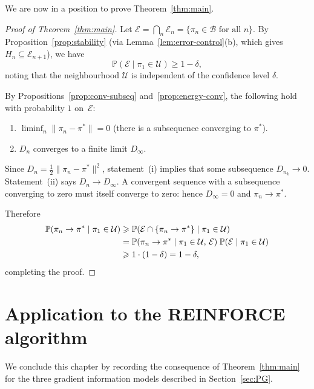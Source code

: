 \documentclass[a4paper,oneside,11pt]{report}
\newcommand{\Prob}{\mathbb{P}}
\newcommand{\calB}{\mathcal{B}}
\newcommand{\calE}{\mathcal{E}}
\newcommand{\calU}{\mathcal{U}}
\newcommand{\norm}[1]{\| #1 \|}
\numberwithin{theorem}{chapter}
\numberwithin{equation}{chapter}
\begin{document}
We are now in a position to prove Theorem~\ref{thm:main}.

\begin{proof}[Proof of Theorem~\ref{thm:main}]
  Let $\calE = \bigcap_n \calE_n = \{\pi_n \in \calB \text{ for all }
  n\}$. By Proposition~\ref{prop:stability} (via
  Lemma~\ref{lem:error-control}(b), which gives
  $H_n \subseteq \calE_{n+1}$), we have
  \begin{equation}
    \Prob(\calE \mid \pi_1 \in \calU) \ge 1 - \delta,
    \label{eq:E-prob}
  \end{equation}
  noting that the neighbourhood $\calU$ is independent of the
  confidence level $\delta$.

  By Propositions~\ref{prop:conv-subseq} and~\ref{prop:energy-conv},
  the following hold with probability $1$ on~$\calE$:
  \begin{enumerate}[label=(\roman*)]
  \item $\liminf_n \norm{\pi_n - \pi^*} = 0$ (there is a subsequence
    converging to $\pi^*$).
  \item $D_n$ converges to a finite limit $D_\infty$.
  \end{enumerate}
  Since $D_n = \tfrac{1}{2}\norm{\pi_n - \pi^*}^2$, statement~(i)
  implies that some subsequence $D_{n_k} \to 0$.
  Statement~(ii) says $D_n \to D_\infty$. A convergent sequence with a
  subsequence converging to zero must itself converge to zero: hence
  $D_\infty = 0$ and $\pi_n \to \pi^*$.

  Therefore
  \begin{align}
    \Prob(\pi_n \to \pi^* \mid \pi_1 \in \calU)
    &\ge \Prob(\calE \cap \{\pi_n \to \pi^*\} \mid \pi_1 \in \calU)
      \notag\\
    &= \Prob(\pi_n \to \pi^* \mid \pi_1 \in \calU,\, \calE)\;
       \Prob(\calE \mid \pi_1 \in \calU)
    \notag\\
    &\ge 1 \cdot (1 - \delta) = 1 - \delta,
    \label{eq:final-bound}
  \end{align}
  completing the proof.
\end{proof}


\section{Application to the REINFORCE algorithm}
\label{sec:corollary}

We conclude this chapter by recording the consequence of
Theorem~\ref{thm:main} for the three gradient information models
described in Section~\ref{sec:PG}.
\end{document}
